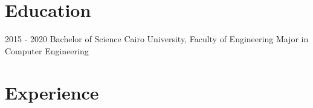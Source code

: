 \documentclass[a4paper]{twentysecondcv} %
\begin{document}
\makeprofile %

\vspace{-0.25cm}
\section{Education}{\faGraduationCap}

\begin{twenty} %
	\twentyitemshorttest
    	{2015 - 2020}
        {}
        {Bachelor of Science}
        {Cairo University, Faculty of Engineering}
        {Major in Computer Engineering}

	
\end{twenty}


\vspace{-0.25cm}

\section{Experience}{\faAlignJustify}
\end{document}
